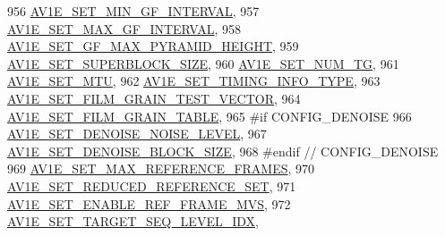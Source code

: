 \begin{DoxyCodeInclude}
{{{{{{{956                                         \hyperlink{group__aom__encoder_ggae78dde67a6d78f332e9bdba0dde42db5a31bcfcb7057884ceb831146c90086ddd}{AV1E\_SET\_MIN\_GF\_INTERVAL},
957                                         \hyperlink{group__aom__encoder_ggae78dde67a6d78f332e9bdba0dde42db5a0355cea227ab76f9bd77028a39bbfca8}{AV1E\_SET\_MAX\_GF\_INTERVAL},
958                                         \hyperlink{group__aom__encoder_ggae78dde67a6d78f332e9bdba0dde42db5a685f831a5a5d08f9b5a14209d55ac129}{AV1E\_SET\_GF\_MAX\_PYRAMID\_HEIGHT},
959                                         \hyperlink{group__aom__encoder_ggae78dde67a6d78f332e9bdba0dde42db5a8854a06c62269e866d6bac0f3a2e3dc2}{AV1E\_SET\_SUPERBLOCK\_SIZE},
960                                         \hyperlink{group__aom__encoder_ggae78dde67a6d78f332e9bdba0dde42db5a9ac0044ad63e6848a482db04f0858c44}{AV1E\_SET\_NUM\_TG},
961                                         \hyperlink{group__aom__encoder_ggae78dde67a6d78f332e9bdba0dde42db5a353037d84b6c47ac0138fa843b70a2bb}{AV1E\_SET\_MTU},
962                                         \hyperlink{group__aom__encoder_ggae78dde67a6d78f332e9bdba0dde42db5a857e822046c62a4c774b1d16c4e453dd}{AV1E\_SET\_TIMING\_INFO\_TYPE},
963                                         \hyperlink{group__aom__encoder_ggae78dde67a6d78f332e9bdba0dde42db5a437e6b282a2395b4b08a9acde3e41cfb}{AV1E\_SET\_FILM\_GRAIN\_TEST\_VECTOR},
964                                         \hyperlink{group__aom__encoder_ggae78dde67a6d78f332e9bdba0dde42db5ad5846c6f49d37e65a03c39e68d487097}{AV1E\_SET\_FILM\_GRAIN\_TABLE},
965 \textcolor{preprocessor}{#if CONFIG\_DENOISE}
966                                         \hyperlink{group__aom__encoder_ggae78dde67a6d78f332e9bdba0dde42db5a54fe460f126a7566aa627cd82826faf0}{AV1E\_SET\_DENOISE\_NOISE\_LEVEL},
967                                         \hyperlink{group__aom__encoder_ggae78dde67a6d78f332e9bdba0dde42db5ae113c7e68a6c39b872a268ed6cdf6d10}{AV1E\_SET\_DENOISE\_BLOCK\_SIZE},
968 \textcolor{preprocessor}{#endif  // CONFIG\_DENOISE}
969                                         \hyperlink{group__aom__encoder_ggae78dde67a6d78f332e9bdba0dde42db5adaa8c4b0f736003b552d1d7d68877f6f}{AV1E\_SET\_MAX\_REFERENCE\_FRAMES},
970                                         \hyperlink{group__aom__encoder_ggae78dde67a6d78f332e9bdba0dde42db5a17fe8deb975a641c65d1dce6b5e3a4e0}{AV1E\_SET\_REDUCED\_REFERENCE\_SET},
971                                         \hyperlink{group__aom__encoder_ggae78dde67a6d78f332e9bdba0dde42db5a5e82346d8463bf758967abb0d03ebc88}{AV1E\_SET\_ENABLE\_REF\_FRAME\_MVS},
972                                         \hyperlink{group__aom__encoder_ggae78dde67a6d78f332e9bdba0dde42db5abc032ee5a8dc3f51ab88b64737590f1b}{AV1E\_SET\_TARGET\_SEQ\_LEVEL\_IDX},
}}}}}}}
\end{DoxyCodeInclude}
